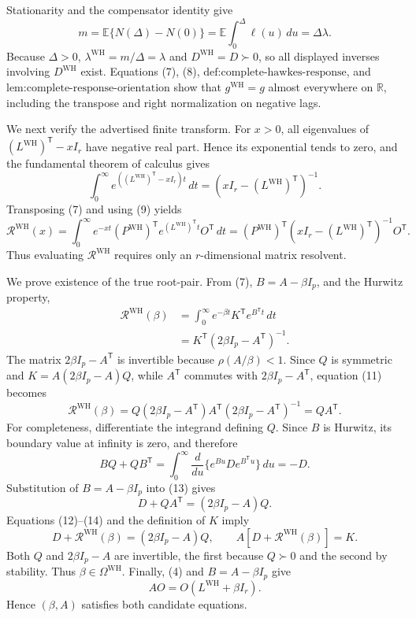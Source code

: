 Stationarity and the compensator identity give
\[
 m=\mathbb E\{N(\Delta)-N(0)\}
 =\mathbb E\int_0^\Delta\ell(u)\,du=\Delta\lambda.
\tag{8}
\]
Because \(\Delta>0\), \(\lambda^{\mathrm{WH}}=m/\Delta=\lambda\) and \(D^{\mathrm{WH}}=D\succ0\), so all displayed inverses involving \(D^{\mathrm{WH}}\) exist.  Equations (7), (8), \(\text{def:complete-hawkes-response}\), and \(\text{lem:complete-response-orientation}\) show that \(g^{\mathrm{WH}}=g\) almost everywhere on \(\mathbb R\), including the transpose and right normalization on negative lags.

We next verify the advertised finite transform.  For \(x>0\), all eigenvalues of \((L^{\mathrm{WH}})^{\mathsf T}-xI_r\) have negative real part.  Hence its exponential tends to zero, and the fundamental theorem of calculus gives
\[
 \int_0^\infty e^{((L^{\mathrm{WH}})^{\mathsf T}-xI_r)t}\,dt
 =(xI_r-(L^{\mathrm{WH}})^{\mathsf T})^{-1}.
\tag{9}
\]
Transposing (7) and using (9) yields
\[
 \mathcal R^{\mathrm{WH}}(x)
 =\int_0^\infty e^{-xt}(P^{\mathrm{WH}})^{\mathsf T}
 e^{(L^{\mathrm{WH}})^{\mathsf T}t}O^{\mathsf T}\,dt
 =(P^{\mathrm{WH}})^{\mathsf T}(xI_r-(L^{\mathrm{WH}})^{\mathsf T})^{-1}O^{\mathsf T}.
\tag{10}
\]
Thus evaluating \(\mathcal R^{\mathrm{WH}}\) requires only an \(r\)-dimensional matrix resolvent.

We prove existence of the true root-pair.  From (7), \(B=A-\beta I_p\), and the Hurwitz property,
\[
 \begin{aligned}
 \mathcal R^{\mathrm{WH}}(\beta)
 &=\int_0^\infty e^{-\beta t}K^{\mathsf T}e^{B^{\mathsf T}t}\,dt\\
 &=K^{\mathsf T}(2\beta I_p-A^{\mathsf T})^{-1}.
 \end{aligned}
\tag{11}
\]
The matrix \(2\beta I_p-A^{\mathsf T}\) is invertible because \(\rho(A/\beta)<1\).  Since \(Q\) is symmetric and \(K=A(2\beta I_p-A)Q\), while \(A^{\mathsf T}\) commutes with \(2\beta I_p-A^{\mathsf T}\), equation (11) becomes
\[
 \mathcal R^{\mathrm{WH}}(\beta)
 =Q(2\beta I_p-A^{\mathsf T})A^{\mathsf T}
   (2\beta I_p-A^{\mathsf T})^{-1}=QA^{\mathsf T}.
\tag{12}
\]
For completeness, differentiate the integrand defining \(Q\).  Since \(B\) is Hurwitz, its boundary value at infinity is zero, and therefore
\[
 BQ+QB^{\mathsf T}
 =\int_0^\infty\frac{d}{du}
   \{e^{Bu}De^{B^{\mathsf T}u}\}\,du=-D.
\tag{13}
\]
Substitution of \(B=A-\beta I_p\) into (13) gives
\[
 D+QA^{\mathsf T}=(2\beta I_p-A)Q.
\tag{14}
\]
Equations (12)--(14) and the definition of \(K\) imply
\[
 D+\mathcal R^{\mathrm{WH}}(\beta)=(2\beta I_p-A)Q,\qquad
 A[D+\mathcal R^{\mathrm{WH}}(\beta)]=K.
\tag{15}
\]
Both \(Q\) and \(2\beta I_p-A\) are invertible, the first because \(Q\succ0\) and the second by stability.  Thus \(\beta\in\Omega^{\mathrm{WH}}\).  Finally, (4) and \(B=A-\beta I_p\) give
\[
 AO=O(L^{\mathrm{WH}}+\beta I_r).
\tag{16}
\]
Hence \((\beta,A)\) satisfies both candidate equations.

